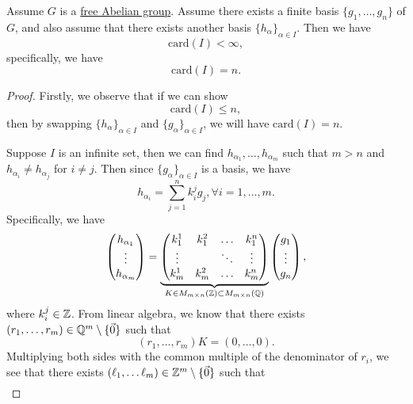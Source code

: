 \begin{theorem}
	Assume \(G\) is a \hyperref[def:free-Abelian-group]{free Abelian group}. Assume there exists a finite basis \(\{g_1, \ldots , g_{n}  \}\) of \(G\), and also assume that there exists another basis
	\(\{h_\alpha \}_{\alpha \in I}\). Then we have
	\[
		\mathrm{card}(I)< \infty,
	\]
	specifically, we have
	\[
		\mathrm{card} (I)= n.
	\]
\end{theorem}
\begin{proof}
	Firstly, we observe that if we can show
	\[
		\mathrm{card} (I) \leq n,
	\]
	then by swapping \(\{h_\alpha \}_{\alpha \in I}\) and \(\{g_\alpha \}_{\alpha \in I}\), we will have \(\mathrm{card}(I) = n \).

	Suppose \(I\) is an infinite set, then we can find \(h_{\alpha _1}, \ldots , h_{\alpha _m} \) such that \(m>n\) and \(h_{\alpha _i} \neq h_{\alpha _j}\) for \(i \neq j\).
	Then since \(\{g_\alpha \}_{\alpha \in I}\) is a basis, we have
	\[
		h_{\alpha _{i} } = \sum\limits_{j=1}^{n} k_{i} ^j g_{j} , \forall i = 1, \ldots , m.
	\]
	Specifically, we have
	\[
		\begin{pmatrix}
			h_{\alpha _1} \\
			\vdots        \\
			h_{\alpha _m} \\
		\end{pmatrix} = \underbrace{\begin{pmatrix}
				k_1^1  & k_1^2 & \ldots & k_1^{n} \\
				\vdots &       & \ddots & \vdots  \\
				k_m^1  & k_m^2 & \ldots & k_m^{n} \\
			\end{pmatrix}}_{K\in M_{m\times n}(\mathbb{\MakeUppercase{z}})\subset M_{m\times n}(\mathbb{\MakeUppercase{q}} )}\begin{pmatrix}
			g_1    \\
			\vdots \\
			g_{n}  \\
		\end{pmatrix},
	\]
	where \(k_{i} ^j\in \mathbb{\MakeUppercase{z}} \). From linear algebra, we know that there exists \((r_1, \ldots, r _{m})\in \mathbb{\MakeUppercase{q}} ^m\setminus \{\vec{0} \}\) such that
	\[
		(r_1, \ldots , r_{m}) K = (0, \ldots , 0 ).
	\]
	Multiplying both sides with the common multiple of the denominator of \(r_{i}\), we see that there exists \((\ell _1, \ldots \ell _{m})\in \mathbb{\MakeUppercase{z}} ^m\setminus \{\vec{0} \}\) such that
	\[
		\begin{split}

\end{split}\]
\end{proof}
